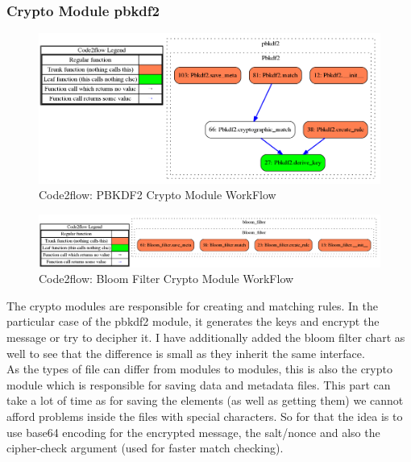\documentclass{eplmastersthesis}
\begin{document}
\subsubsection{Crypto Module \gls{pbkdf2}}

\begin{figure}[h!]
\begin{center}
	\includegraphics[scale=0.3]{res/flowPBKDF2}
	\caption{Code2flow: PBKDF2 Crypto Module WorkFlow}
	\label{code2flow-pbkdf2}
\end{center}
\end{figure}

\begin{figure}[h!]
\begin{center}
	\includegraphics[scale=0.3]{res/flowBloomFilter}
	\caption{Code2flow: Bloom Filter Crypto Module WorkFlow}
	\label{code2flow-bloom}
\end{center}
\end{figure}

The crypto modules are responsible for creating and matching rules. In the particular case of the \gls{pbkdf2} module, it generates the keys and encrypt the message or try to decipher it.
I have additionally added the bloom filter chart as well to see that the difference is small as they inherit the same interface.\\

As the types of file can differ from modules to modules, this is also the crypto module which is responsible for saving data and metadata files.
This part can take a lot of time as for saving the elements (as well as getting them) we cannot afford problems inside the files with special characters. So for that the idea is to use base64 encoding for the encrypted message, the salt/nonce and also the cipher-check argument (used for faster match checking).\\
\end{document}
